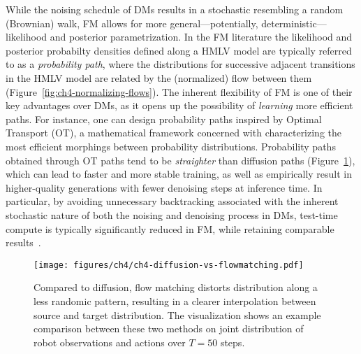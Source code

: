 While the noising schedule of DMs results in a stochastic resembling a random (Brownian) walk, FM allows for more general---potentially, deterministic---likelihood and posterior parametrization.
In the FM literature the likelihood and posterior probabilty densities defined along a HMLV model are typically referred to as a \emph{probability path}, where the distributions for successive adjacent transitions in the HMLV model are related by the (normalized) flow between them (Figure~\ref{fig:ch4-normalizing-flows}).
The inherent flexibility of FM is one of their key advantages over DMs, as it opens up the possibility of \emph{learning} more efficient paths.
For instance, one can design probability paths inspired by Optimal Transport (OT), a mathematical framework concerned with characterizing the most efficient morphings between probability distributions.
Probability paths obtained through OT paths tend to be \emph{straighter} than diffusion paths (Figure~\ref{fig:ch4-diffusion-paths-versus-fm}), which can lead to faster and more stable training, as well as empirically result in higher-quality generations with fewer denoising steps at inference time.
In particular, by avoiding unnecessary backtracking associated with the inherent stochastic nature of both the noising and denoising process in DMs, test-time compute is typically significantly reduced in FM, while retaining comparable results~\citep{lipmanFlowMatchingGenerative2023}.

\begin{figure}
    \centering
    \texttt{[image: figures/ch4/ch4-diffusion-vs-flowmatching.pdf]}
    \caption{Compared to diffusion, flow matching distorts distribution along a less randomic pattern, resulting in a clearer interpolation between source and target distribution. The visualization shows an example comparison between these two methods on joint distribution of robot observations and actions over \( T=50 \) steps.}
    \label{fig:ch4-diffusion-paths-versus-fm}
\end{figure}


